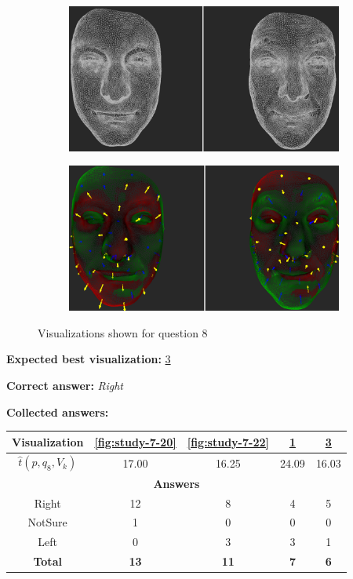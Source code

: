 \begin{figure}[h]
\begin{subfigure}{0.49\textwidth}
\includegraphics[width=\textwidth]{./img-study/pair19.PNG}
\caption{}
\label{fig:study-7-19}
\end{subfigure}
\begin{subfigure}{0.49\textwidth}
\includegraphics[width=\textwidth]{./img-study/pair21.PNG}
\caption{}
\label{fig:study-7-21}
\end{subfigure}
\caption{Visualizations shown for question 8}
\end{figure}
\medskip

{\bf Expected best visualization:} \ref{fig:study-7-21}
\medskip

{\bf Correct answer:} {\it Right}
\medskip

{\bf Collected answers:}

\begin{center}
\begin{tabular}{| c | c | c | c | c |}
	\hline
	Visualization & \ref{fig:study-7-20} & \ref{fig:study-7-22} & \ref{fig:study-7-19} & \ref{fig:study-7-21}\\ \hline
	\(\widehat{t}(p, q_8, V_k)\) & 17.00 & 16.25 & 24.09 & 16.03\\ \hline
	\multicolumn{5}{|c|}{\bf Answers} \\ \hline
	\rowcolor{yellow!30} Right & 12 & 8 & 4 & 5\\ \hline
	NotSure & 1 & 0 & 0 & 0\\ \hline
	Left & 0 & 3 & 3 & 1\\ \hline
	{\bf Total} & {\bf 13} & {\bf 11} & {\bf 7} & {\bf 6}\\ \hline
\end{tabular}
\end{center}
\clearpage

